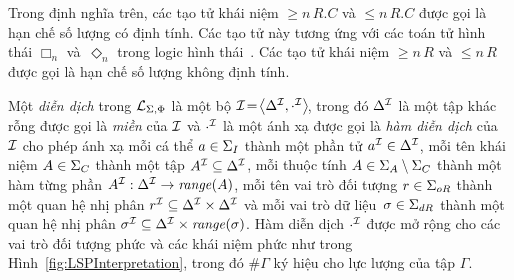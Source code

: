 Trong định nghĩa trên, các tạo tử khái niệm $\geq\!n\,R.C$ và $\leq\!n\,R.C$ được gọi là hạn chế số lượng có định tính. Các tạo tử này tương ứng với các toán tử hình thái $\Box_n$ và~$\Diamond_n$ trong logic hình thái~\cite{Montanari1997,Divroodi2011B}. Các tạo tử khái niệm $\geq\!n\,R$ và $\leq\!n\,R$ được gọi là hạn chế số lượng không định tính.

\begin{Definition}
\label{def:LSPInterpretation}
Một {\em diễn dịch} trong $\mathcal{L}_{\Sigma,\Phi}$ là một bộ \mbox{$\mathcal{I}\!=\! \left\langle\Delta^{\mathcal{I}}, \cdot^{\mathcal{I}}\right\rangle\!$}, trong đó $\Delta^{\mathcal{I}}$ là một tập khác rỗng được gọi là {\em miền} của $\mathcal{I}$ và $\cdot^{\mathcal{I}}$ là một ánh xạ được gọi là {\em hàm diễn dịch} của $\mathcal{I}$ cho phép ánh xạ mỗi cá thể $a \in \Sigma_I$ thành một phần tử $a^{\mathcal{I}} \in \Delta^{\mathcal{I}}$, mỗi tên khái niệm $A \in \Sigma_C$ thành một tập $A^{\mathcal{I}} \subseteq \Delta^{\mathcal{I}}$, mỗi thuộc tính $A \in \Sigma_A \setminus \Sigma_C$ thành một hàm từng phần $A^{\mathcal{I}} : \Delta^{\mathcal{I}} \to \mathit{range}(A)$, mỗi tên vai trò đối tượng $r \in \Sigma_{oR}$ thành một quan hệ nhị phân $r^{\mathcal{I}} \subseteq \Delta^{\mathcal{I}} \times \Delta^{\mathcal{I}}$ và mỗi vai trò dữ liệu~$\sigma \in \Sigma_{dR}$ thành một quan hệ nhị phân $\sigma^{\mathcal{I}} \subseteq \Delta^{\mathcal{I}} \times \mathit{range}(\sigma)$.
Hàm diễn dịch $\cdot^{\mathcal{I}}$ được mở rộng cho các vai trò đối tượng phức và các khái niệm phức như trong Hình~\ref{fig:LSPInterpretation}, trong đó $\#\Gamma$ ký hiệu cho lực lượng của tập $\Gamma$.\myend
\end{Definition}

